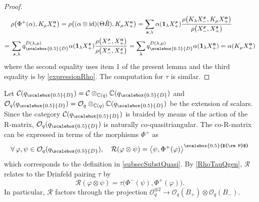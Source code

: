 \documentclass[11pt]{amsart}
\newcommand{\Oo}{\mathcal{O}}
\newcommand{\qD}{q_{\scalebox{0.5}{D}}}
\newcommand{\Pup}{{\scalebox{0.5}{${\rm P}$}}}
\begin{document}
\begin{proof}
\begin{align*}
&\rho\bigl( \Phi^+(\alpha), K_\mu X_+^{\boldsymbol{a}} \bigr) = \rho\bigl( (\alpha \otimes \mathrm{id})(\Theta\hat{R}), K_\mu X_+^{\boldsymbol{a}} \bigr) = \sum_{\boldsymbol{s},\lambda} \alpha(\boldsymbol{1}_\lambda X_+^{\boldsymbol{s}}) \frac{\rho\bigl( K_\lambda X_-^{\boldsymbol{s}}, K_\mu X_+^{\boldsymbol{a}} \bigr)}{\rho\bigl( X_-^{\boldsymbol{s}}, X_+^{\boldsymbol{s}} \bigr)}\\
=\:& \sum_{\boldsymbol{s},\lambda} \qD^{D(\lambda,\mu)}\alpha(\boldsymbol{1}_\lambda X_+^{\boldsymbol{s}}) \frac{\rho\bigl( X_-^{\boldsymbol{s}}, X_+^{\boldsymbol{a}} \bigr)}{\rho\bigl( X_-^{\boldsymbol{s}}, X_+^{\boldsymbol{s}} \bigr)} = \sum_{\lambda} \qD^{D(\lambda,\mu)}\alpha(\boldsymbol{1}_\lambda X_+^{\boldsymbol{a}}) = \alpha(K_\mu X_+^{\boldsymbol{a}})
\end{align*}
where the second equality uses item 1 of the present lemma and the third equality is by \eqref{expressionRho}. The computation for $\tau$ is similar.
\end{proof}

Let $\mathcal{C}(\qD) = \mathcal{C} \otimes_{\mathbb{C}(q)} \mathbb{C}(\qD)$ and $\mathcal{O}_q(\qD) = \mathcal{O}_q \otimes_{\mathbb{C}(q)} \mathbb{C}(\qD)$ be the extension of scalars. Since the category $\mathcal{C}(\qD)$ is braided by means of the action of the R-matrix, $\mathcal{O}_q(\qD)$ is naturally co-quasitriangular. The co-R-matrix can be expressed in terms of the morphisms $\Phi^+$ as
\begin{equation}\label{coRmatOq}
\forall \, \varphi, \psi \in \mathcal{O}_q(\qD), \quad \mathcal{R}(\varphi \otimes \psi) = \bigl\langle \psi, \Phi^+(\varphi)  \bigr\rangle^\Pup
\end{equation}
which corresponds to the definition in \textsection \ref{subsecSubstQuasi}. By \eqref{RhoTauQgen}, $\mathcal{R}$ relates to the Drinfeld pairing $\tau$ by
\[ \mathcal{R}(\varphi \otimes \psi) = \tau\bigl( \Phi^-(\psi), \Phi^+(\varphi) \bigr). \]
In particular, $\mathcal{R}$ factors through the projection $\Oo_q^{\otimes 2} \to \Oo_q(B_+) \otimes \Oo_q(B_-)$.

\smallskip
\end{document}
